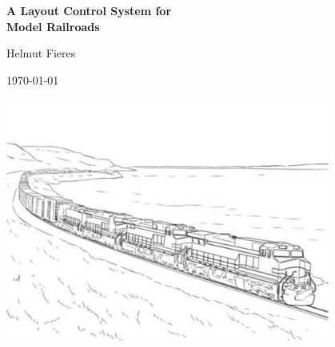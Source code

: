 \thispagestyle{empty}

\begingroup
	\enlargethispage{\textheight}
	\begin{center}
  	{\Huge \textbf{A Layout Control System for \\ Model Railroads}}\par
  	\vspace{1cm}
  	{\Large Helmut Fieres}\par
  	{\large \today}\par
  	\vspace{2cm}
    \includegraphics[width=0.8\textwidth]{titlepage/Frontpage-Picture.png}
    \end{center}
\endgroup
\clearpage
\cleardoublepage
